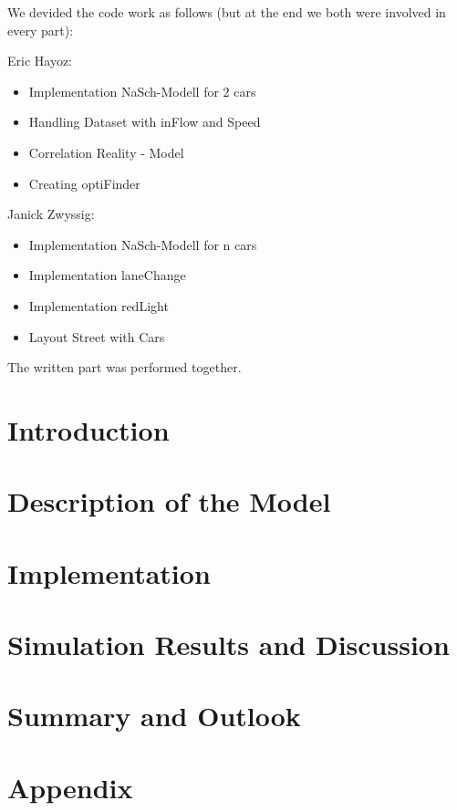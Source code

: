 \documentclass[11pt]{article}
\begin{document}
We devided the code work as follows (but at the end we both were involved in every part):

Eric Hayoz:
\begin{itemize}
\item Implementation NaSch-Modell for 2 cars 
\item Handling Dataset with inFlow and Speed 
\item Correlation Reality - Model
\item Creating optiFinder 
\end{itemize}

Janick Zwyssig:
\begin{itemize}
\item Implementation NaSch-Modell for n cars
\item Implementation laneChange 
\item Implementation redLight 
\item Layout Street with Cars 
\end{itemize}

The written part was performed together.

\section{Introduction}



\section{Description of the Model}




\section{Implementation}






\section{Simulation Results and Discussion}



\section{Summary and Outlook}



\section{Appendix}


%
\end{document}
